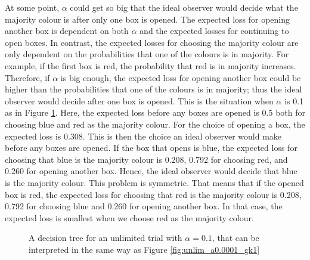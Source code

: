 At some point, $\alpha$ could get so big that the ideal observer would decide what the majority colour is after only one box is opened. The expected loss for opening another box is dependent on both $\alpha$ and the expected losses for continuing to open boxes. In contrast, the expected losses for choosing the majority colour are only dependent on the probabilities that one of the colours is in majority. For example, if the first box is red, the probability that red is in majority increases. Therefore, if $\alpha$ is big enough, the expected loss for opening another box could be higher than the probabilities that one of the colours is in majority; thus the ideal observer would decide after one box is opened. This is the situation when $\alpha$ is 0.1 as in Figure \ref{fig:unlim_a0.1_gk1}. Here, the expected loss before any boxes are opened is 0.5 both for choosing blue and red as the majority colour. For the choice of opening a box, the expected loss is 0.308. This is then the choice an ideal observer would make before any boxes are opened. If the box that opens is blue, the expected loss for choosing that blue is the majority colour is 0.208, 0.792 for choosing red, and 0.260 for opening another box. Hence, the ideal observer would decide that blue is the majority colour. This problem is symmetric. That means that if the opened box is red, the expected loss for choosing that red is the majority colour is 0.208, 0.792 for choosing blue and 0.260 for opening another box. In that case, the expected loss is smallest when we choose red as the majority colour.
\begin{figure}
    \centering
    \scalebox{1}{}
    \caption[IO solution, unlimited. $\alpha=0.1$,$\gamma=\kappa=1$]{A decision tree for an unlimited trial with $\alpha = 0.1$, that can be interpreted in the same way as Figure \ref{fig:unlim_a0.0001_gk1}}
    \label{fig:unlim_a0.1_gk1}
\end{figure}


